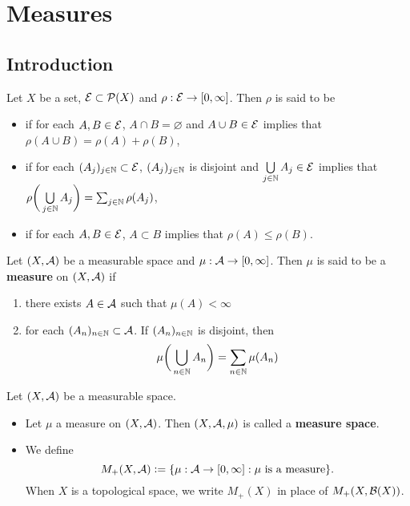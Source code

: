 \documentclass{book}
\begin{document}
	
	
	
	
	
	
	
	
	
	\newpage
	\chapter{Measures}
	
	\section{Introduction}
	
	
	
	\begin{defn} 
		Let $X$ be a set, $\mathcal{E} \subset \mathcal{P}(X)$ and $\rho: \mathcal{E} \rightarrow [0,\infty]$. Then $\rho$ is said to be 
		\begin{itemize}
			\item {} if for each $A, B \in \mathcal{E}$, $A \cap B = \varnothing$ and $A \cup B \in \mathcal{E}$ implies that $\rho(A \cup B) = \rho(A) + \rho(B)$,
			\item {} if for each $(A_j)_{j \in \mathbb{N}} \subset \mathcal{E}$, $(A_j)_{j \in \mathbb{N}}$ is disjoint and $\bigcup\limits_{j \in \mathbb{N}} A_j \in \mathcal{E}$ implies that $\rho \bigg( \bigcup\limits_{j \in \mathbb{N}} A_j \bigg) = \sum_{j \in \mathbb{N}} \rho(A_j)$,
			\item {} if for each $A, B \in \mathcal{E}$, $A \subset B$ implies that $\rho(A) \leq \rho(B)$.
		\end{itemize}
	\end{defn}
	
	\begin{defn} 
		Let $(X, \mathcal{A})$ be a measurable space and $\mu:\mathcal{A} \rightarrow [0,\infty]$. Then $\mu$ is said to be a \textbf{measure} on $(X, \mathcal{A})$ if 
		\begin{enumerate}
			\item there exists $A \in \mathcal{A}$ such that $\mu(A)< \infty$
			\item for each $(A_n)_{n \in \mathbb{N}} \subset \mathcal{A}$. If $(A_n)_{n \in \mathbb{N}}$ is disjoint, then $$\mu\bigg(\bigcup_{n \in \mathbb{N}}A_n \bigg) = \sum_{n \in \mathbb{N}}\mu(A_n)$$
		\end{enumerate}
	\end{defn}
	
	\begin{defn} 
		Let $(X,\mathcal{A})$ be a measurable space. 
		\begin{itemize}
			\item Let $\mu$ a measure on $(X, \mathcal{A})$. Then $(X, \mathcal{A}, \mu)$ is called a \textbf{measure space}. 
			\item We define 
			$$M_+(X, \mathcal{A}) \vcentcolon= \{\mu: \mathcal{A} \rightarrow [0,\infty]: \mu \text{ is a measure}\}.$$ 
			When $X$ is a topological space, we write $M_+(X)$ in place of $M_+(X, \mathcal{B}(X))$.
		\end{itemize}
	\end{defn}
	
\end{document}
